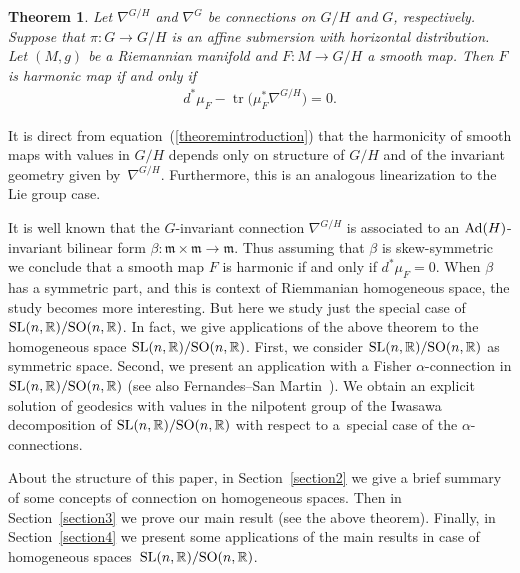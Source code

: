 \documentclass[10pt,a4paper]{amsart}
\numberwithin{equation}{section}
\newcommand{\m}{\mathfrak{m}}
\newtheorem*{theorem*}{Theorem}
\begin{document}
\begin{theorem*}
    Let $\nabla^{G/H}$ and $\nabla^{G}$ be connections on $G/H$ and $G$, respectively. Suppose that $\pi\colon  G \rightarrow G/H$ is an affine submersion with horizontal distribution. Let $(M,g)$ be a Riemannian manifold and $F\colon M \rightarrow G/H$ a smooth map. Then $F$ is harmonic map if and only if
    \begin{gather}\label{theoremintroduction}
      d^{*}\mu_{F}  - \operatorname{tr}\big(\mu_{F} ^* \nabla^{G/H}\big) = 0.
    \end{gather}
\end{theorem*}

It is direct from equation~(\ref{theoremintroduction}) that the
harmonicity of smooth maps with values in $G/H$ depends only on
structure of $G/H$ and of the invariant geometry given by~$\nabla^{G/H}$. Furthermore, this is an analogous linearization  to
the Lie group case.

It is well known that the $G$-invariant connection $\nabla^{G/H}$ is
associated to an ${\rm Ad}(H)$-invariant bilinear form $\beta\colon \m
\times \m \rightarrow \m$. Thus assuming that $\beta$ is
skew-symmetric we conclude that a smooth map $F$ is harmonic if and
only if $d^{*}\mu_{F} = 0$. When $\beta$ has a symmetric part, and
this is context of Riemmanian homogeneous space, the study becomes
more interesting. But here we study just the special case of ${\rm
SL}(n, {\mathbb R})/{\rm SO}(n,\mathbb{R})$. In fact, we give
applications of the above theorem to the homogeneous space ${\rm
SL}(n, {\mathbb R})/{\rm SO}(n,\mathbb{R})$. First, we consider ${\rm
SL}(n, {\mathbb R})/{\rm SO}(n,\mathbb{R})$ as symmetric space. Second,
we present an application with a Fisher $\alpha$-connection in ${\rm
SL}(n, {\mathbb R})/{\rm SO}(n,\mathbb{R})$ (see also Fernandes--San
Martin~\cite{FernandesM/San-MartinL,FernandesM/San-MartinL2}). We obtain an explicit solution of
geodesics with values in the nilpotent group of the Iwasawa
decomposition of ${\rm SL}(n, {\mathbb R})/{\rm SO}(n,\mathbb{R})$ with
respect to a~special case of the $\alpha$-connections.



About the structure of this paper, in Section~\ref{section2} we give a brief summary of some concepts of connection on homogeneous spaces. Then in Section~\ref{section3} we prove our main result (see the above theorem). Finally, in Section~\ref{section4} we present some applications of the main results in case of homogeneous spaces~${\rm SL}(n, {\mathbb R})/{\rm SO}(n,\mathbb{R})$.
\end{document}
